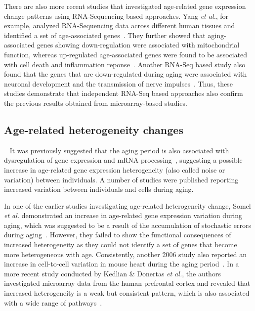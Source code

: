 There are also more recent studies that investigated age-related gene expression change patterns using RNA-Sequencing based approaches.
Yang \textit{et al.}, for example, analyzed RNA-Sequencing data across different human tissues and identified a set of age-associated genes~\cite{Yang2015}.
They further showed that aging-associated genes showing down-regulation were associated with mitochondrial function,
whereas up-regulated age-associated genes were found to be associated with cell death and inflammation reponse~\cite{Yang2015}.
Another RNA-Seq based study also found that the genes that are down-regulated during aging were associated with
neuronal development and the transmission of nerve impulses~\cite{Naumova2012}.
Thus, these studies demonstrate that independent RNA-Seq based approaches also confirm the previous results obtained from microarray-based studies.

\subsection{Age-related heterogeneity changes}~\label{intro:het.change}
It was previously suggested that the aging period is also associated with dysregulation of gene expression and mRNA processing~\cite{Frenk2018},
suggesting a possible increase in age-related gene expression heterogeneity (also called noise or variation) between individuals.
A number of studies were published reporting increased variation between individuals and cells during aging.

In one of the earlier studies investigating age-related heterogeneity change, 
Somel \textit{et al.} demonstrated an increase in age-related gene expression variation during aging,
which was suggested to be a result of the accumulation of stochastic errors during aging~\cite{Somel2006}.
However, they failed to show the functional consequences of increased heterogeneity 
as they could not identify a set of genes that become more heterogeneous with age.
Consistently, another 2006 study also reported an increase in cell-to-cell variation in mouse heart during the aging period~\cite{Bahar2006}.
In a more recent study conducted by Kedlian \& Donertas \textit{et al.}, the authors investigated 
microarray data from the human prefrontal cortex and revealed that increased heterogeneity is a weak but consistent pattern,
which is also associated with a wide range of pathways~\cite{Kedlian2019}.

